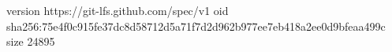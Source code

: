 version https://git-lfs.github.com/spec/v1
oid sha256:75e4f0c915fe37dc8d58712d5a71f7d2d962b977ee7eb418a2ee0d9bfeaa499c
size 24895
